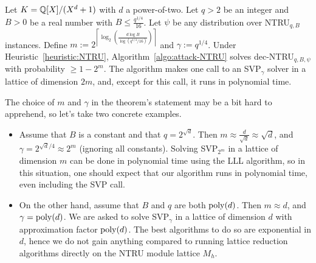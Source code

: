 \begin{theorem}
\label{thm:attack-NTRU}
Let $K = \mathbb{Q}[X]/(X^d+1)$ with $d$ a power-of-two. Let $q >2$ be an integer and $B > 0$ be a real number with $B \leq \frac{q^{1/4}}{16}$. Let $\psi$ be any distribution over NTRU$_{q,B}$ instances. Define $m := 2^{\left\lceil \log_2\left(\frac{d\log B}{\log(q^{1/4}/16)}\right)\right\rceil}$ and $\gamma := q^{1/4}$.
Under Heuristic~\ref{heuristic:NTRU}, Algorithm~\ref{algo:attack-NTRU} solves dec-NTRU$_{q,B,\psi}$ with probability $\geq 1-2^m$. The algorithm makes one call to an SVP$_\gamma$ solver in a lattice of dimension $2m$, and, except for this call, it runs in polynomial time.
\end{theorem}

The choice of $m$ and $\gamma$ in the theorem's statement may be a bit hard to apprehend, so let's take two concrete examples. 
\begin{itemize}
\item Assume that $B$ is a constant and that $q = 2^{\sqrt{d}}$. Then $m \approx \frac{d}{\sqrt{d}} \approx \sqrt{d}$, and $\gamma = 2^{\sqrt{d}/4} \approx 2^{m}$ (ignoring all constants). Solving SVP$_{2^m}$ in a lattice of dimension $m$ can be done in polynomial time using the LLL algorithm, so in this situation, one should expect that our algorithm runs in polynomial time, even including the SVP call.

\item On the other hand, assume that $B$ and $q$ are both $\operatorname{poly}(d)$. Then $m \approx d$, and $\gamma = \operatorname{poly}(d)$. We are asked to solve SVP$_{\gamma}$ in a lattice of dimension $d$ with approximation factor $\operatorname{poly}(d)$. The best algorithms to do so are exponential in $d$, hence we do not gain anything compared to running lattice reduction algorithms directly on the NTRU module lattice $M_h$.
\end{itemize}

